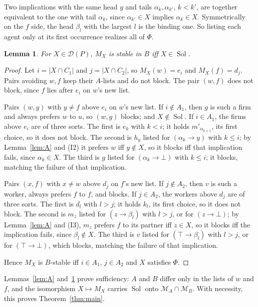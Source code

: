 \documentclass[11pt]{amsart}
\newtheorem{lemma}[theorem]{Lemma}
\theoremstyle{definition}
\theoremstyle{remark}
\newcommand{\D}{\mathcal D}
\newcommand{\Sol}{\operatorname{Sol}}
\begin{document}
Two implications with the same head $y$ and tails $\alpha_k,\alpha_{k'}$, $k<k'$, are together equivalent to the one with tail $\alpha_k$, since $\alpha_{k'}\in X$ implies $\alpha_k\in X$. Symmetrically on the $f$ side, the head $\beta_l$ with the largest $l$ is the binding one. So listing each agent only at its first occurrence realizes all of $\Phi$.

\begin{lemma}\label{lem:B}
For $X\in\D(P)$, $M_X$ is stable in $B$ iff $X\in\Sol$.
\end{lemma}

\begin{proof}
Let $i=|X\cap C_1|$ and $j=|X\cap C_2|$, so $M_X(w)=e_i$ and $M_X(f)=d_j$. Pairs avoiding $w,f$ keep their $A$-lists and do not block. The pair $(w,f)$ does not block, since $f$ lies after $e_i$ on $w$'s new list.

Pairs $(w,y)$ with $y\ne f$ above $e_i$ on $w$'s new list. If $i\notin A_1$, then $g$ is such a firm and always prefers $w$ to $u$, so $(w,g)$ blocks; and $X\notin\Sol$. If $i\in A_1$, the firms above $e_i$ are of three sorts. The first is $e_k$ with $k<i$; it holds $m'_{\alpha_{k+1}}$, its first choice, so it does not block. The second is $h_y$ listed for $(\alpha_k\to y)$ with $k\le i$; by Lemma~\ref{lem:A} and (I2) it prefers $w$ iff $y\notin X$, so it blocks iff that implication fails, since $\alpha_k\in X$. The third is $g$ listed for $(\alpha_k\to\bot)$ with $k\le i$; it blocks, matching the failure of that implication.

Pairs $(x,f)$ with $x\ne w$ above $d_j$ on $f$'s new list. If $j\notin A_2$, then $v$ is such a worker, always prefers $f$ to $\hat f$, and blocks. If $j\in A_2$, the workers above $d_j$ are of three sorts. The first is $d_l$ with $l>j$; it holds $k_l$, its first choice, so it does not block. The second is $m_z$ listed for $(z\to\beta_l)$ with $l>j$, or for $(z\to\bot)$; by Lemma~\ref{lem:A} and (I3), $m_z$ prefers $f$ to its partner iff $z\in X$, so it blocks iff the implication fails, since $\beta_l\notin X$. The third is $v$ listed for $(\top\to\beta_l)$ with $l>j$, or for $(\top\to\bot)$, which blocks, matching the failure of that implication.

Hence $M_X$ is $B$-stable iff $i\in A_1$, $j\in A_2$ and $X$ satisfies $\Phi$.
\end{proof}

Lemmas~\ref{lem:A} and~\ref{lem:B} prove sufficiency: $A$ and $B$ differ only in the lists of $w$ and $f$, and the isomorphism $X\mapsto M_X$ carries $\Sol$ onto $\mathcal M_A\cap\mathcal M_B$. With necessity, this proves Theorem~\ref{thm:main}.
\end{document}
